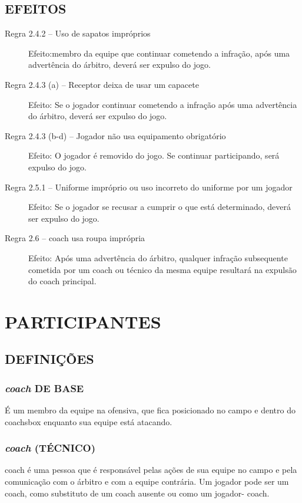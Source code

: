 \section*{EFEITOS}

\begin{description}
	\item[Regra 2.4.2 -- Uso de sapatos impróprios]  Efeito:membro da equipe que continuar cometendo a infração, após uma advertência do árbitro, deverá ser expulso do jogo.

	\item [Regra 2.4.3 (a) -- Receptor deixa de usar um capacete] Efeito: Se o jogador continuar cometendo a infração após uma advertência do árbitro, deverá ser expulso do jogo.

	\item[Regra 2.4.3 (b-d) -- Jogador não usa equipamento obrigatório] Efeito: O jogador é removido do jogo. Se continuar participando, será expulso do jogo.

	\item[Regra 2.5.1 -- Uniforme impróprio ou uso incorreto do uniforme por um jogador] Efeito: Se o jogador se recusar a cumprir o que está determinado, deverá ser expulso do jogo.

	\item[Regra 2.6 -- \gls{coach} usa roupa imprópria] Efeito: Após uma advertência do árbitro, qualquer infração subsequente cometida por um \gls{coach} ou técnico da mesma equipe resultará na expulsão do \gls{coach} principal.
\end{description}

\chapter{PARTICIPANTES}
\minitoc%

\section{DEFINIÇÕES}
\subsection{\textit{coach} DE BASE}
 É um membro da equipe na ofensiva, que fica posicionado no campo e dentro do \gls{coachsbox}
enquanto sua equipe está atacando.

\subsection{\textit{coach} (TÉCNICO)}
 \gls{coach} é uma pessoa que é responsável pelas ações de sua equipe no campo e pela comunicação com o árbitro e com a equipe contrária. Um jogador pode ser um \gls{coach}, como substituto de um \gls{coach} ausente ou como um jogador- \gls{coach}.

